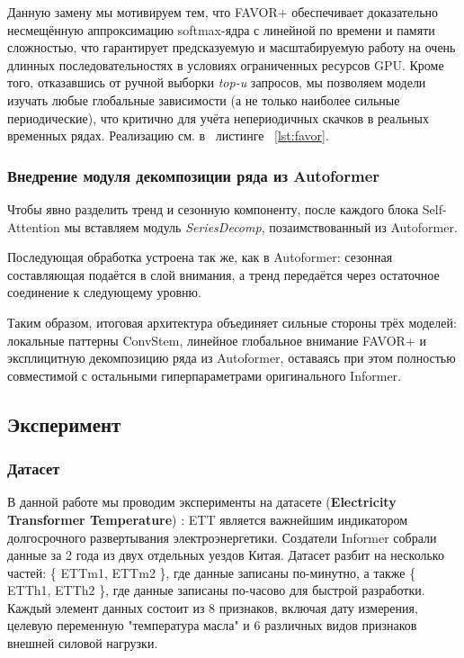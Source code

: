 Данную замену мы мотивируем тем, что FAVOR+ обеспечивает доказательно 
несмещённую аппроксимацию softmax-ядра с линейной по времени и памяти 
сложностью, что гарантирует предсказуемую и масштабируемую работу на очень 
длинных последовательностях в условиях ограниченных ресурсов GPU. Кроме того, 
отказавшись от ручной выборки \textit{top-u} запросов, мы позволяем модели изучать 
любые глобальные зависимости (а не только наиболее сильные периодические), 
что критично для учёта непериодичных скачков в реальных временных рядах.
Реализацию см. в ~листинге~ \ref{lst:favor}.


\subsubsection{Внедрение модуля декомпозиции ряда из Autoformer}

Чтобы явно разделить тренд и сезонную компоненту, после каждого блока
Self-Attention мы вставляем модуль \textit{SeriesDecomp}, позаимствованный из
Autoformer.

Последующая обработка устроена так же, как в Autoformer: сезонная составляющая
подаётся в слой внимания, а тренд передаётся через остаточное соединение к
следующему уровню.

Таким образом, итоговая архитектура объединяет сильные стороны трёх моделей:
локальные паттерны ConvStem, линейное глобальное внимание FAVOR+ и эксплицитную
декомпозицию ряда из Autoformer, оставаясь при этом полностью совместимой с
остальными гиперпараметрами оригинального Informer.

\subsection{Эксперимент}

\subsubsection{Датасет}

В данной работе мы проводим эксперименты на датасете 
(\textbf{Electricity Transformer Temperature}) \cite{informer}:
ETT является важнейшим индикатором долгосрочного развертывания 
электроэнергетики. Создатели Informer собрали данные за 
2 года из двух отдельных уездов Китая. Датасет разбит на несколько 
частей: \{ ETTm1, ETTm2 \}, где данные записаны по-минутно, а 
также \{ ETTh1, ETTh2 \}, где данные записаны по-часово 
для быстрой разработки. Каждый элемент данных состоит из 
8 признаков, включая дату измерения, целевую переменную 
"температура масла" и 6 различных видов признаков внешней силовой 
нагрузки.  

